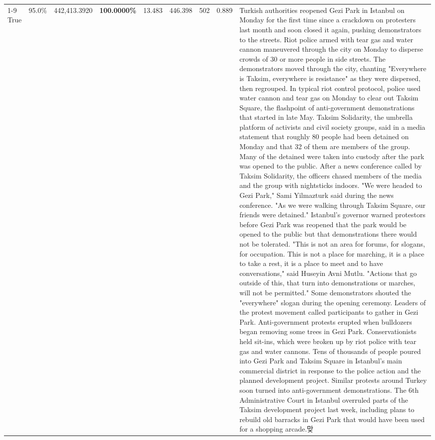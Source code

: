 \begin{table}[H]
\begin{tabular}{lllrlllll}
\cline{1-9}
True & 95.0\% & 442,413.3920 & \bfseries \color{red} 100.0000\% & 13.483 & 446.398 & 502 & 0.889 & Turkish authorities reopened Gezi Park in Istanbul on Monday for the first time since a crackdown on protesters last month and soon closed it again, pushing demonstrators to the streets. Riot police armed with tear gas and water cannon maneuvered through the city on Monday to disperse crowds of 30 or more people in side streets. The demonstrators moved through the city, chanting "Everywhere is Taksim, everywhere is resistance" as they were dispersed, then regrouped. In typical riot control protocol, police used water cannon and tear gas on Monday to clear out Taksim Square, the flashpoint of anti-government demonstrations that started in late May. Taksim Solidarity, the umbrella platform of activists and civil society groups, said in a media statement that roughly 80 people had been detained on Monday and that 32 of them are members of the group. Many of the detained were taken into custody after the park was opened to the public. After a news conference called by Taksim Solidarity, the officers chased members of the media and the group with nightsticks indoors. "We were headed to Gezi Park," Sami Yilmazturk said during the news conference. "As we were walking through Taksim Square, our friends were detained." Istanbul's governor warned protestors before Gezi Park was reopened that the park would be opened to the public but that demonstrations there would not be tolerated. "This is not an area for forums, for slogans, for occupation. This is not a place for marching, it is a place to take a rest, it is a place to meet and to have conversations," said Huseyin Avni Mutlu. "Actions that go outside of this, that turn into demonstrations or marches, will not be permitted." Some demonstrators shouted the "everywhere" slogan during the opening ceremony. Leaders of the protest movement called participants to gather in Gezi Park. Anti-government protests erupted when bulldozers began removing some trees in Gezi Park. Conservationists held sit-ins, which were broken up by riot police with tear gas and water cannons. Tens of thousands of people poured into Gezi Park and Taksim Square in Istanbul's main commercial district in response to the police action and the planned development project. Similar protests around Turkey soon turned into anti-government demonstrations. The 6th Administrative Court in Istanbul overruled parts of the Taksim development project last week, including plans to rebuild old barracks in Gezi Park that would have been used for a shopping arcade.맞 \\

\end{tabular}
\end{table}
